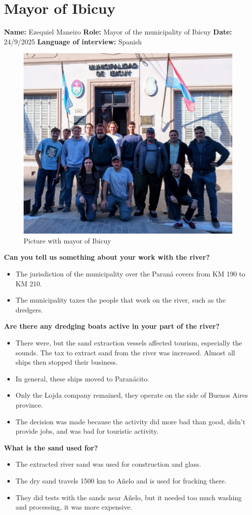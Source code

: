 \section{Mayor of Ibicuy}
\textbf{Name:} Ezequiel Maneiro \newline
\textbf{Role:} Mayor of the municipality of Ibicuy \newline
\textbf{Date:} 24/9/2025 \newline
\textbf{Language of interview:} Spanish
\begin{figure}[H]
    \centering
    \includegraphics[width=0.4\linewidth]{figures/appendixE/InterviewMayor.jpeg}
    \caption{Picture with mayor of Ibicuy}
\end{figure}

\textbf{Can you tell us something about your work with the river?}
\begin{itemize}
    \item The jurisdiction of the municipality over the Paraná covers from KM 190 to KM 210.
    \item The municipality taxes the people that work on the river, such as the dredgers.    
\end{itemize}

\textbf{Are there any dredging boats active in your part of the river?}
\begin{itemize}
    \item There were, but the sand extraction vessels affected tourism, especially the sounds. The tax to extract sand from the river was increased. Almost all ships then stopped their business.
    \item In general, these ships moved to Paranácito.
    \item Only the Lojda company remained, they operate on the side of Buenos Aires province.
    \item The decision was made because the activity did more bad than good, didn’t provide jobs, and was bad for touristic activity.
\end{itemize}

\textbf{What is the sand used for?}
\begin{itemize}
    \item The extracted river sand was used for construction and glass.
    \item The dry sand travels 1500 km to Añelo and is used for fracking there.
    \item They did tests with the sands near Añelo, but it needed too much washing and processing, it was more expensive. 
\end{itemize}

